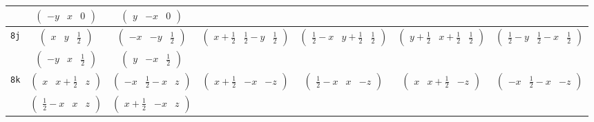 \documentclass[fleqn,9pt,landscape]{jsarticle}
\begin{document}
\begin{center}
\begin{longtable}{ccccccc}
& $ \begin{pmatrix} - y & x & 0 \end{pmatrix} $ & $ \begin{pmatrix} y & - x & 0 \end{pmatrix} $ & $  $ & $  $ & $  $ & $  $ \\ \hline
{\tt 8j} & $ \begin{pmatrix} x & y & \frac{1}{2} \end{pmatrix} $ & $ \begin{pmatrix} - x & - y & \frac{1}{2} \end{pmatrix} $ & $ \begin{pmatrix} x + \frac{1}{2} & \frac{1}{2} - y & \frac{1}{2} \end{pmatrix} $ & $ \begin{pmatrix} \frac{1}{2} - x & y + \frac{1}{2} & \frac{1}{2} \end{pmatrix} $ & $ \begin{pmatrix} y + \frac{1}{2} & x + \frac{1}{2} & \frac{1}{2} \end{pmatrix} $ & $ \begin{pmatrix} \frac{1}{2} - y & \frac{1}{2} - x & \frac{1}{2} \end{pmatrix} $ \\
& $ \begin{pmatrix} - y & x & \frac{1}{2} \end{pmatrix} $ & $ \begin{pmatrix} y & - x & \frac{1}{2} \end{pmatrix} $ & $  $ & $  $ & $  $ & $  $ \\ \hline
{\tt 8k} & $ \begin{pmatrix} x & x + \frac{1}{2} & z \end{pmatrix} $ & $ \begin{pmatrix} - x & \frac{1}{2} - x & z \end{pmatrix} $ & $ \begin{pmatrix} x + \frac{1}{2} & - x & - z \end{pmatrix} $ & $ \begin{pmatrix} \frac{1}{2} - x & x & - z \end{pmatrix} $ & $ \begin{pmatrix} x & x + \frac{1}{2} & - z \end{pmatrix} $ & $ \begin{pmatrix} - x & \frac{1}{2} - x & - z \end{pmatrix} $ \\
& $ \begin{pmatrix} \frac{1}{2} - x & x & z \end{pmatrix} $ & $ \begin{pmatrix} x + \frac{1}{2} & - x & z \end{pmatrix} $ & $  $ & $  $ & $  $ & $  $ \\ \hline

\end{longtable}
\end{center}
\end{document}
